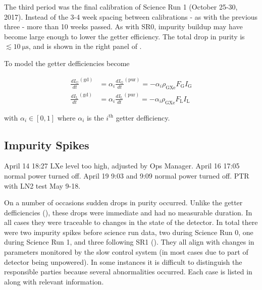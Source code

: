 The third period was the final  calibration of Science Run 1 (October 25-30, 2017).  Instead of the 3-4 week spacing between
calibrations - as with the previous three - more than 10 weeks passed.  As with SR0, impurity buildup may have become
large enough to lower the getter efficiency.  The total drop in purity is $\lesssim 10\ \mathrm{\mu s}$, and is shown in the right panel
of .

To model the getter defficiencies 
become

\vspace{-20pt}

\begin{subequations}
\begin{align}
\frac{dI_{\mathrm{G}}}{dt}^{(\mathrm{gd})} &= \alpha_i \frac{dI_{\mathrm{G}}}{dt}^{(\mathrm{pur})} =
-\alpha_i \rho_{\mathrm{GXe}} F_{\mathrm{G}} I_{\mathrm{G}}
\label{eq:electron_lifetime_model_detector_effects_getter_gxe}
\\
\frac{dI_{\mathrm{L}}}{dt}^{(\mathrm{gd})} &= \alpha_i \frac{dI_{\mathrm{L}}}{dt}^{(\mathrm{pur})} =
-\alpha_i \rho_{\mathrm{GXe}} F_{\mathrm{L}} I_{\mathrm{L}}
\label{eq:electron_lifetime_model_detector_effects_getter_lxe}
\end{align}
\end{subequations}

\noindent with $\alpha_i \in [0, 1]$ where $\alpha_i$ is the $i^{\mathrm{th}}$ getter defficiency.



\subsection{Impurity Spikes}
\label{subsec:electron_lifetime_model_detector_effects_spikes}
April 14 18:27 LXe level too high, adjusted by Ops Manager.  April 16 17:05 normal power turned off.  April 19 9:03 and 9:09 normal power
turned off.  PTR with LN2 test May 9-18.

On a number of occasions sudden drops in purity occurred.  Unlike the getter defficiencies
(), these drops were immediate and
had no measurable duration.  In all cases they were traceable to changes in the state of the detector.  In total there were two impurity
spikes before science run data, two during Science Run 0, one during Science Run 1, and three following SR1
().  They all align with changes in parameters monitored by the slow control system (in most
cases due to part of detector being unpowered).  In some
instances it is difficult to distinguish the responsible parties because several abnormalities occurred.  Each case is listed in
 along with relevant information.

